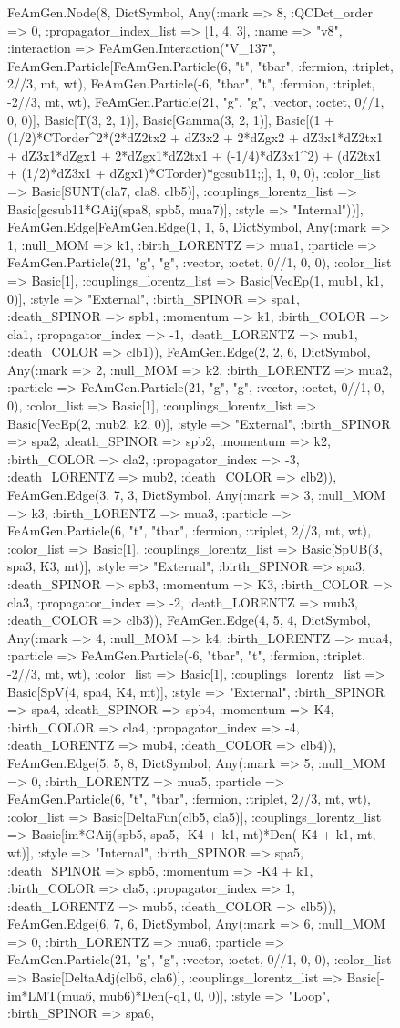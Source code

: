 \documentclass{revtex4}
\begin{document}
\begin{figure}[!htb]
\begin{center}
{FeAmGen.Node(8, Dict{Symbol, Any}(:mark => 8, :QCDct_order => 0, :propagator_index_list => [1, 4, 3], :name => "v8", :interaction => FeAmGen.Interaction("V_137", FeAmGen.Particle[FeAmGen.Particle(6, "t", "tbar", :fermion, :triplet, 2//3, mt, wt), FeAmGen.Particle(-6, "tbar", "t", :fermion, :triplet, -2//3, mt, wt), FeAmGen.Particle(21, "g", "g", :vector, :octet, 0//1, 0, 0)], Basic[T(3, 2, 1)], Basic[Gamma(3, 2, 1)], Basic[(1 + (1/2)*CTorder^2*(2*dZ2tx2 + dZ3x2 + 2*dZgx2 + dZ3x1*dZ2tx1 + dZ3x1*dZgx1 + 2*dZgx1*dZ2tx1 + (-1/4)*dZ3x1^2) + (dZ2tx1 + (1/2)*dZ3x1 + dZgx1)*CTorder)*gcsub11;;], 1, 0, 0), :color_list => Basic[SUNT(cla7, cla8, clb5)], :couplings_lorentz_list => Basic[gcsub11*GAij(spa8, spb5, mua7)], :style => "Internal"))], FeAmGen.Edge[FeAmGen.Edge(1, 1, 5, Dict{Symbol, Any}(:mark => 1, :null_MOM => k1, :birth_LORENTZ => mua1, :particle => FeAmGen.Particle(21, "g", "g", :vector, :octet, 0//1, 0, 0), :color_list => Basic[1], :couplings_lorentz_list => Basic[VecEp(1, mub1, k1, 0)], :style => "External", :birth_SPINOR => spa1, :death_SPINOR => spb1, :momentum => k1, :birth_COLOR => cla1, :propagator_index => -1, :death_LORENTZ => mub1, :death_COLOR => clb1)), FeAmGen.Edge(2, 2, 6, Dict{Symbol, Any}(:mark => 2, :null_MOM => k2, :birth_LORENTZ => mua2, :particle => FeAmGen.Particle(21, "g", "g", :vector, :octet, 0//1, 0, 0), :color_list => Basic[1], :couplings_lorentz_list => Basic[VecEp(2, mub2, k2, 0)], :style => "External", :birth_SPINOR => spa2, :death_SPINOR => spb2, :momentum => k2, :birth_COLOR => cla2, :propagator_index => -3, :death_LORENTZ => mub2, :death_COLOR => clb2)), FeAmGen.Edge(3, 7, 3, Dict{Symbol, Any}(:mark => 3, :null_MOM => k3, :birth_LORENTZ => mua3, :particle => FeAmGen.Particle(6, "t", "tbar", :fermion, :triplet, 2//3, mt, wt), :color_list => Basic[1], :couplings_lorentz_list => Basic[SpUB(3, spa3, K3, mt)], :style => "External", :birth_SPINOR => spa3, :death_SPINOR => spb3, :momentum => K3, :birth_COLOR => cla3, :propagator_index => -2, :death_LORENTZ => mub3, :death_COLOR => clb3)), FeAmGen.Edge(4, 5, 4, Dict{Symbol, Any}(:mark => 4, :null_MOM => k4, :birth_LORENTZ => mua4, :particle => FeAmGen.Particle(-6, "tbar", "t", :fermion, :triplet, -2//3, mt, wt), :color_list => Basic[1], :couplings_lorentz_list => Basic[SpV(4, spa4, K4, mt)], :style => "External", :birth_SPINOR => spa4, :death_SPINOR => spb4, :momentum => K4, :birth_COLOR => cla4, :propagator_index => -4, :death_LORENTZ => mub4, :death_COLOR => clb4)), FeAmGen.Edge(5, 5, 8, Dict{Symbol, Any}(:mark => 5, :null_MOM => 0, :birth_LORENTZ => mua5, :particle => FeAmGen.Particle(6, "t", "tbar", :fermion, :triplet, 2//3, mt, wt), :color_list => Basic[DeltaFun(clb5, cla5)], :couplings_lorentz_list => Basic[im*GAij(spb5, spa5, -K4 + k1, mt)*Den(-K4 + k1, mt, wt)], :style => "Internal", :birth_SPINOR => spa5, :death_SPINOR => spb5, :momentum => -K4 + k1, :birth_COLOR => cla5, :propagator_index => 1, :death_LORENTZ => mub5, :death_COLOR => clb5)), FeAmGen.Edge(6, 7, 6, Dict{Symbol, Any}(:mark => 6, :null_MOM => 0, :birth_LORENTZ => mua6, :particle => FeAmGen.Particle(21, "g", "g", :vector, :octet, 0//1, 0, 0), :color_list => Basic[DeltaAdj(clb6, cla6)], :couplings_lorentz_list => Basic[-im*LMT(mua6, mub6)*Den(-q1, 0, 0)], :style => "Loop", :birth_SPINOR => spa6, }
\end{center}
\end{figure}
\end{document}
